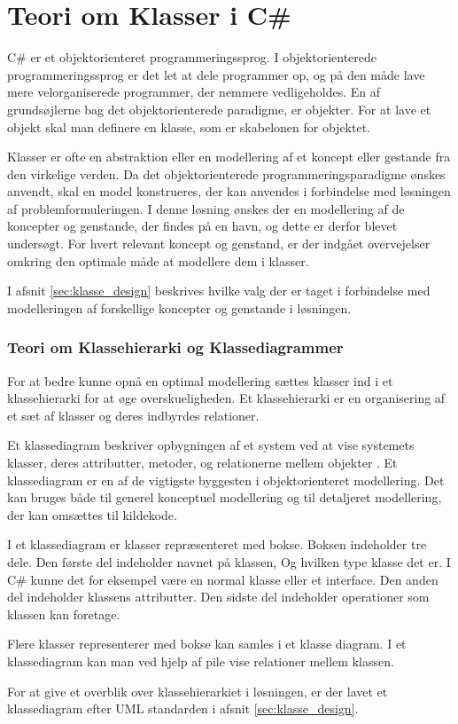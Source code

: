 \section{Teori om Klasser i C\#}
\label{sec:klasse_teori}

C\# er et objektorienteret programmeringssprog. I objektorienterede programmeringssprog er det let at dele programmer op, og på den måde lave mere velorganiserede programmer, der nemmere vedligeholdes. En af grundsøjlerne bag det objektorienterede paradigme, er objekter. For at lave et objekt skal man definere en klasse, som er skabelonen for objektet. 

Klasser er ofte en abstraktion eller en modellering af et koncept eller gestande fra den virkelige verden. Da det objektorienterede programmeringsparadigme ønskes anvendt, skal en model konstrueres, der kan anvendes i forbindelse med løsningen af problemformuleringen. I denne løsning ønskes der en modellering af de koncepter og genstande, der findes på en havn, og dette er derfor blevet undersøgt. For hvert relevant koncept og genstand, er der indgået overvejelser omkring den optimale måde at modellere dem i klasser.

I afsnit \cref{sec:klasse_design} beskrives hvilke valg der er taget i forbindelse med modelleringen af forskellige koncepter og genstande i løsningen.

\subsubsection{Teori om Klassehierarki og Klassediagrammer}
\label{sub:uml_teori}


For at bedre kunne opnå en optimal modellering sættes klasser ind i et klassehierarki for at øge overskueligheden. Et klassehierarki er en organisering af et sæt af klasser og deres indbyrdes relationer.

Et klassediagram beskriver opbygningen af et system ved at vise systemets klasser, deres attributter, metoder, og relationerne mellem objekter \cite{martin2006agile}. Et klassediagram er en af de vigtigste byggesten i objektorienteret modellering. Det kan bruges både til generel konceptuel modellering og til detaljeret modellering, der kan omsættes til kildekode. 

I et klassediagram er klasser repræsenteret med bokse. Boksen indeholder tre dele. Den første del indeholder navnet på klassen, Og hvilken type klasse det er. I C\# kunne det for eksempel være en normal klasse eller et interface. Den anden del indeholder klassens attributter. Den sidste del indeholder operationer som klassen kan foretage.

Flere klasser representerer med bokse kan samles i et klasse diagram. I et klassediagram kan man ved hjelp af pile vise relationer mellem klassen.

For at give et overblik over klassehierarkiet i løsningen, er der lavet et klassediagram efter UML standarden i afsnit \cref{sec:klasse_design}.
